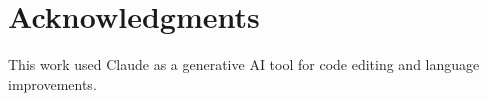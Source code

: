 \documentclass[sigplan,anonymous,review,nonacm]{acmart}
\begin{document}
\maketitle



% 


% 





\section*{Acknowledgments}
This work used Claude as a generative AI tool for code editing and language improvements.


\balance

\end{document}
